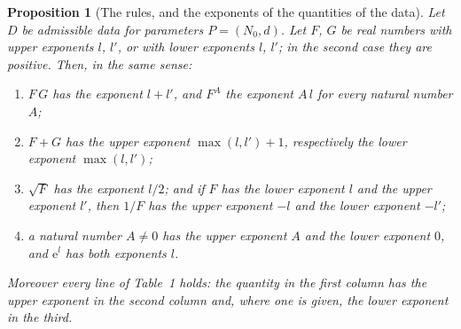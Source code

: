 \documentclass[11pt,a4paper]{article}
\theoremstyle{plainx}
\newtheorem{proposition}[theorem]{Proposition}
\theoremstyle{uprightx}
\begin{document}
\begin{proposition}[The rules, and the exponents of the quantities of the data]\label{p:table}
Let $D$ be admissible data for parameters $P=(N_0,d)$. Let $F$, $G$ be real numbers with upper exponents $l$, $l'$,
or with lower exponents $l$, $l'$; in the second case they are positive. Then, in the same sense:
\begin{enumerate}[label=(\alph*)]
\item $F\,G$ has the exponent $l+l'$, and $F^{A}$ the exponent $A\,l$ for every natural number $A$;
\item $F+G$ has the upper exponent $\max(l,l')+1$, respectively the lower exponent $\max(l,l')$;
\item $\sqrt F$ has the exponent $l/2$; and if $F$ has the lower exponent $l$ and the upper exponent $l'$, then $1/F$
has the upper exponent $-l$ and the lower exponent $-l'$;
\item a natural number $A\ne0$ has the upper exponent $A$ and the lower exponent $0$, and $\mathrm{e}^{l}$ has both
exponents $l$.
\end{enumerate}
Moreover every line of Table~1 holds: the quantity in the first column has the upper exponent in the second column
and, where one is given, the lower exponent in the third.
\end{proposition}
\end{document}
